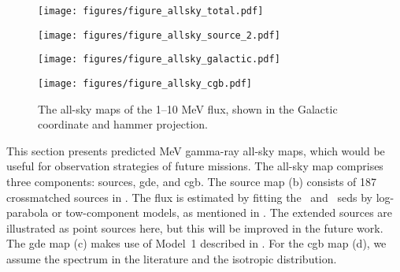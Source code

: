 \documentclass[a4paper,11pt]{article}
\begin{document}
\begin{figure}[t!]
\centering
  \begin{minipage}[b]{0.45\linewidth}
    \centering
    \texttt{[image: figures/figure\_allsky\_total.pdf]}
  \end{minipage}
  \begin{minipage}[b]{0.45\linewidth}
    \centering
    \texttt{[image: figures/figure\_allsky\_source\_2.pdf]}
  \end{minipage}
  \vspace{1mm}
  \begin{minipage}[b]{0.45\linewidth}
    \centering
    \texttt{[image: figures/figure\_allsky\_galactic.pdf]}
  \end{minipage}
  \begin{minipage}[b]{0.45\linewidth}
    \centering
    \texttt{[image: figures/figure\_allsky\_cgb.pdf]}
  \end{minipage}
\caption{
The all-sky maps of the 1--10 MeV flux, shown in the Galactic coordinate and hammer projection. 
\label{fig:allsky}
}
\end{figure}


This section presents predicted MeV gamma-ray all-sky maps, which would be useful for observation strategies of future missions.
The all-sky map comprises three components: sources, \acf{gde}, and \acf{cgb}.
The source map (b) consists of 187 crossmatched sources in \cite{tsuji_cross-match_2021}. 
The flux is estimated by fitting the \bat\ and \lat\ \acp{sed} by log-parabola or tow-component models, as mentioned in .
The extended sources are illustrated as point sources here, but this will be improved in the future work.
The \ac{gde} map (c) makes use of Model~1 \cite{ackermann_fermi_2012} described in .
For the \ac{cgb} map (d), we assume the spectrum in the literature \cite{weidenspointner_cosmic_2000} and the isotropic distribution.
\end{document}
